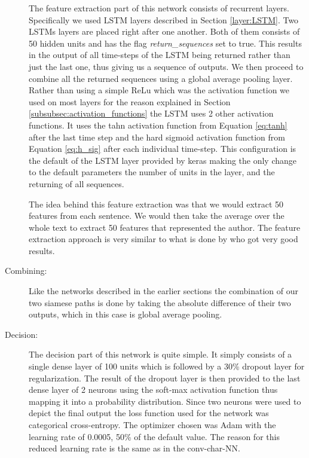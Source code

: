 \begin{description}
        The feature extraction part of this network consists of recurrent
        layers. Specifically we used \gls{LSTM} layers described in Section
        \ref{layer:LSTM}. Two \glspl{LSTM} layers are placed right after one
        another. Both of them consists of 50 hidden units and has the flag
        \textit{return\_sequences} set to true. This results in the output
        of all time-steps of the \gls{LSTM} being returned rather than just
        the last one, thus giving us a sequence of outputs. We then proceed
        to combine all the returned sequences using a global average pooling
        layer. Rather than using a simple \gls{ReLu} which was the activation
        function we used on most layers for the reason explained in Section
        \ref{subsubsec:activation_functions} the \gls{LSTM} uses 2 other
        activation functions. It uses the tahn activation function from Equation
        \eqref{eq:tanh} after the last time step and the hard sigmoid activation
        function from Equation \eqref{eq:h_sig} after each individual time-step.
        This configuration is the default of the \gls{LSTM} layer provided by
        keras making the only change to the default parameters the number of
        units in the layer, and the returning of all sequences.

        The idea behind this feature extraction was that we would extract
        50 features from each sentence. We would then take the average over
        the whole text to extract 50 features that represented the author.
        The feature extraction approach is very similar to what is done by
        \citet{qian:2018} who got very good results.

    \item[Combining:]

        Like the networks described in the earlier sections the combination of
        our two siamese paths is done by taking the absolute difference of
        their two outputs, which in this case is global average pooling.

    \item[Decision:]

        The decision part of this network is quite simple. It simply consists
        of a single dense layer of 100 units which is followed by a 30\%
        dropout layer for regularization. The result of the dropout layer is
        then provided to the last dense layer of 2 neurons using the soft-max
        activation function thus mapping it into a probability distribution.
        Since two neurons were used to depict the final output the loss function
        used for the network was categorical cross-entropy. The optimizer chosen
        was \gls{Adam} with the learning rate of 0.0005, 50\% of the default
        value. The reason for this reduced learning rate is the same as in the
        \gls{conv-char-NN}.

\end{description}

